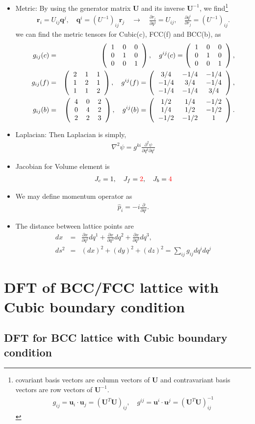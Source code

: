 \documentclass[10pt]{book}
\def\bm{\boldsymbol}
\newcommand{\bea}{\begin{eqnarray}}
\newcommand{\eea}{\end{eqnarray}}
\newcommand{\no}{\nonumber \\}
\newcommand{\del}{\partial}
\def\vq{{\bm q}}
\def\vr{{\bm r}}
\newcommand{\threedmat}[9]
{\left(\begin{tabular}{ccc} {$#1$}&{$#2$}&{$#3$} \\
		{$#4$}&{$#5$}&{$#6$}\\
		{$#7$}&{$#8$}&{$#9$}\\
	    \end{tabular}\right)}
\begin{document}
\begin{itemize}
	\item{Metric:} 
	By using the generator matrix ${\bm U}$ and its inverse ${\bm U}^{-1}$, we find\footnote{
		covariant basis vectors are column vectors of ${\bm U}$
		and contravariant basis vectors are row vectors of ${\bm U}^{-1}$.
		\bea 
		g_{ij}={\bm u}_i\cdot {\bm u}_j= \left({\bm U}^T{\bm U}\right)_{ij},\quad 
		g^{ij}={\bm u}^i\cdot {\bm u}^j=\left({\bm U}^T{\bm U}\right)_{ij}^{-1}
		\eea 
	}
	\bea 
	\vr_i =U_{ij}\vq^j,\quad \vq^i=(U^{-1})_{ij} \vr_j \quad 
	\rightarrow \quad \frac{\del r_i}{\del q^j}=U_{ij}, \quad \frac{\del q^i}{\del r_j}=(U^{-1})_{ij}. 
	\eea  
	we can find the metric tensors for Cubic(c), FCC(f) and BCC(b), as
	\bea 
	g_{ij}(c)&=&\threedmat{1}{0}{0}{0}{1}{0}{0}{0}{1},\quad  
	g^{ij}(c)=\threedmat{1}{0}{0}{0}{1}{0}{0}{0}{1},\no 
	g_{ij}(f)&=&\threedmat{2}{1}{1}{1}{2}{1}{1}{1}{2},\quad  
	g^{ij}(f)=\threedmat{3/4}{-1/4}{-1/4}
	{-1/4}{3/4}{-1/4}
	{-1/4}{-1/4}{3/4}, \no 
	g_{ij}(b)&=&\threedmat{4}{0}{2}{0}{4}{2}{2}{2}{3},\quad 
	g^{ij}(b)=\threedmat{1/2}{1/4}{-1/2}
	{1/4}{1/2}{-1/2}
	{-1/2}{-1/2}{1}.
	\eea
	\item{Laplacian:} 
	Then Laplacian is simply,
	\bea 
	\nabla^2 \psi = g^{ki} \frac{\del^2 \psi}{\del q^k \del q^i} 
	\eea 
	\item Jacobian for Volume element is
	\bea 
	J_c =1 ,\quad J_f= {\color{red}2},\quad J_b= {\color{red}4}
	\eea 
	\item  We may define momentum operator as
	\bea 
	\hat{p}_i =-i \frac{\del}{\del q^i}.
	\eea 
	\item
	The distance between lattice points are 
	\bea 
	dx&=&\frac{\del x}{\del q^1}dq^1+\frac{\del x}{\del q^2}dq^2+\frac{\del x}{\del q^3}dq^3, \no 
	ds^2&=&(dx)^2+(dy)^2+(dz)^2=\sum_{ij} g_{ij}dq^i dq^j  
	\eea 
		
\end{itemize}

\section{DFT of BCC/FCC lattice with Cubic boundary condition }

\subsection{DFT for BCC lattice with Cubic boundary condition}
\end{document}
